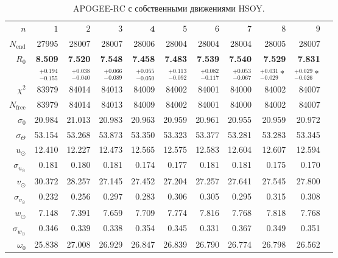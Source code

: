 \documentclass{matmex-diploma-custom}
\begin{document}
\pagebreak
\begin{table}[h!!]
\centering
\caption{APOGEE-RC с собственными движениями HSOY.}
\begin{tabular}{r|rrrrrrrrrr}
\hline
$n$ & $1$ & $2$ & $3$ & $\textbf{4}$ & $5$&$ 6 $&$ 7 $&$ 8 $&$ 9 $\\
 $N_{\mathrm{end}}$ & 27995       &    28007 &   28007 &   28006 &   28004 &   28004 &    28004 &   28005 &   28007 \\
 $R_0 $& \textbf{8.509}       &     \textbf{7.520} &   \textbf{7.548} &   \textbf{7.458} &   \textbf{7.483} &   \textbf{7.539} &     \textbf{7.540} &   \textbf{7.529} &   \textbf{7.831} \\
       & $_{-0.155}^{+0.194} $ & $_{-0.040}^{+0.038}$ & $_{-0.089}^{+0.066}$   & $_{-0.050}^{+0.055}$  & $_{-0.092}^{+0.113}$  & $_{-0.117}^{+0.082}$  & $_{-0.067}^{+0.053}$  & $_{-0.029}^{+0.031} *$  & $_{-0.026}^{+0.029} *$  \\\hline
 $\chi^2 $& 83979   &  84014 &   84013 &   84009 &   84002 &   84001 &  84000 &   84002 &   84007 \\
 $N_{\mathrm{free}} $& 83979   &  84014 &   84013 &   84009 &   84002 &   84001 &  84000 &   84002 &   84007 \\
 $\sigma_0 $& 20.984      &  21.013 &  20.983 &  20.963 &  20.959 &  20.961 &  20.955 &  20.959 &  20.972  \\ 
 $\sigma_{\Theta} $& 53.154      &  53.268 &  53.873 &  53.350 &  53.323 &  53.377 &  53.281 &  53.283 &  53.345  \\\hline 
 $ u_{\odot} $& 12.410      &   12.227 &  12.473 &  12.565 &  12.575 &  12.583 &   12.604 &  12.607 &  12.594 \\
 $\sigma_{u_{\odot}} $&0.181       &     0.180 &   0.181 &   0.174 &   0.177 &   0.181 &    0.181 &   0.175 &    0.170 \\
 $v_{\odot} $& 30.372      &   28.257 &  27.145 &  27.452 &  27.204 &  27.257 &   27.641 &  27.545 &    27.800 \\
 $\sigma_{v_{\odot}}$&0.232       &    0.256 &   0.297 &   0.283 &   0.306 &   0.305 &    0.295 &   0.315 &   0.308 \\
 $w_{\odot} $& 7.148       &    7.391 &   7.659 &   7.709 &   7.774 &   7.816 &    7.768 &   7.818 &   7.768 \\
 $\sigma_{w_{\odot}}$&0.346       &    0.339 &   0.338 &   0.354 &   0.345 &   0.331 &    0.367 &   0.349 &   0.351 \\
 $\omega_0 $&25.838      &   27.008 &  26.929 &  26.847 &  26.839 &   26.790 &   26.774 &  26.798 &  26.562 \\

\end{tabular}
\end{table}
\end{document}
